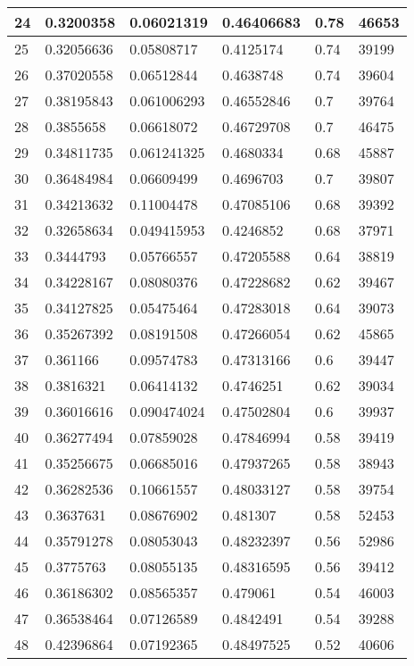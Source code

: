 \begin{longtable}{|l|l|l|l|l|l|}
24 & 0.3200358 & 0.06021319 & 0.46406683 & 0.78 & 46653 \\ \hline 
25 & 0.32056636 & 0.05808717 & 0.4125174 & 0.74 & 39199 \\ \hline 
26 & 0.37020558 & 0.06512844 & 0.4638748 & 0.74 & 39604 \\ \hline 
27 & 0.38195843 & 0.061006293 & 0.46552846 & 0.7 & 39764 \\ \hline 
28 & 0.3855658 & 0.06618072 & 0.46729708 & 0.7 & 46475 \\ \hline 
29 & 0.34811735 & 0.061241325 & 0.4680334 & 0.68 & 45887 \\ \hline 
30 & 0.36484984 & 0.06609499 & 0.4696703 & 0.7 & 39807 \\ \hline 
31 & 0.34213632 & 0.11004478 & 0.47085106 & 0.68 & 39392 \\ \hline 
32 & 0.32658634 & 0.049415953 & 0.4246852 & 0.68 & 37971 \\ \hline 
33 & 0.3444793 & 0.05766557 & 0.47205588 & 0.64 & 38819 \\ \hline 
34 & 0.34228167 & 0.08080376 & 0.47228682 & 0.62 & 39467 \\ \hline 
35 & 0.34127825 & 0.05475464 & 0.47283018 & 0.64 & 39073 \\ \hline 
36 & 0.35267392 & 0.08191508 & 0.47266054 & 0.62 & 45865 \\ \hline 
37 & 0.361166 & 0.09574783 & 0.47313166 & 0.6 & 39447 \\ \hline 
38 & 0.3816321 & 0.06414132 & 0.4746251 & 0.62 & 39034 \\ \hline 
39 & 0.36016616 & 0.090474024 & 0.47502804 & 0.6 & 39937 \\ \hline 
40 & 0.36277494 & 0.07859028 & 0.47846994 & 0.58 & 39419 \\ \hline 
41 & 0.35256675 & 0.06685016 & 0.47937265 & 0.58 & 38943 \\ \hline 
42 & 0.36282536 & 0.10661557 & 0.48033127 & 0.58 & 39754 \\ \hline 
43 & 0.3637631 & 0.08676902 & 0.481307 & 0.58 & 52453 \\ \hline 
44 & 0.35791278 & 0.08053043 & 0.48232397 & 0.56 & 52986 \\ \hline 
45 & 0.3775763 & 0.08055135 & 0.48316595 & 0.56 & 39412 \\ \hline 
46 & 0.36186302 & 0.08565357 & 0.479061 & 0.54 & 46003 \\ \hline 
47 & 0.36538464 & 0.07126589 & 0.4842491 & 0.54 & 39288 \\ \hline 
48 & 0.42396864 & 0.07192365 & 0.48497525 & 0.52 & 40606 \\ \hline 

\end{longtable}
